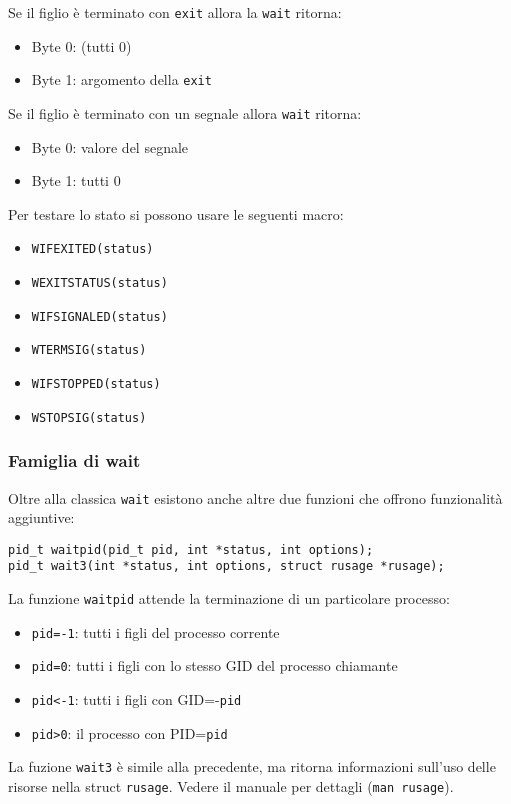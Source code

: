 \documentclass[a4paper]{article}
\begin{document}
Se il figlio è terminato con \verb|exit| allora la \verb|wait| ritorna: 
\begin{itemize}
\item Byte 0: (tutti 0)
\item Byte 1: argomento della \verb|exit|
\end{itemize}
Se il figlio è terminato con un segnale allora \verb|wait| ritorna:
\begin{itemize}
\item Byte 0: valore del segnale
\item Byte 1: tutti 0
\end{itemize}

Per testare lo stato si possono usare le seguenti macro:
\begin{itemize}
\item \verb|WIFEXITED(status)|
\item \verb|WEXITSTATUS(status)|
\item \verb|WIFSIGNALED(status)|
\item \verb|WTERMSIG(status)|
\item \verb|WIFSTOPPED(status)|
\item \verb|WSTOPSIG(status)|
\end{itemize}

\subsubsection{Famiglia di wait}
Oltre alla classica \verb|wait| esistono anche altre due funzioni che offrono funzionalità aggiuntive:
\begin{verbatim}
pid_t waitpid(pid_t pid, int *status, int options);
pid_t wait3(int *status, int options, struct rusage *rusage);
\end{verbatim}

La funzione \verb|waitpid| attende la terminazione di un particolare processo:
\begin{itemize}
\item \verb|pid=-1|: tutti i figli del processo corrente
\item \verb|pid=0|: tutti i figli con lo stesso GID del processo chiamante
\item \verb|pid<-1|: tutti i figli con GID=-\verb|pid|
\item \verb|pid>0|: il processo con PID=\verb|pid|
\end{itemize}
La fuzione \verb|wait3| è simile alla precedente, ma ritorna informazioni sull'uso delle risorse nella struct \verb|rusage|. Vedere il manuale per dettagli (\verb|man rusage|).
\end{document}
